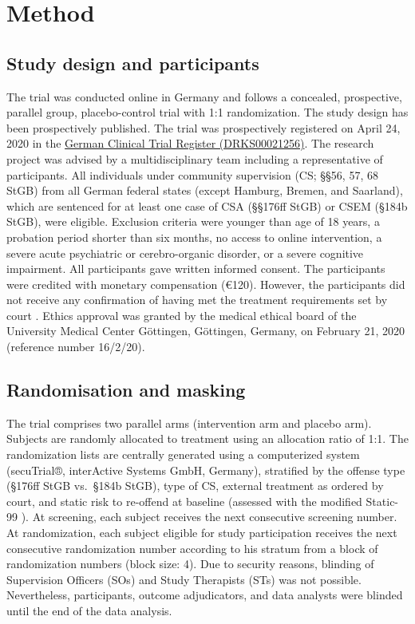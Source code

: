 \documentclass[
  super,
  preprint,
  1p,
  onecolumn]{elsarticle}
\begin{document}
\section{Method}\label{method}

\subsection{Study design and
participants}\label{study-design-and-participants}

The trial was conducted online in Germany and follows a concealed,
prospective, parallel group, placebo-control trial with 1:1
randomization. The study design has been prospectively published.
\citep{frombergerMyTabuAPlaceboControlled2021} The trial was
prospectively registered on April 24, 2020 in the
\href{https://drks.de/search/en/trial/DRKS00021256}{German Clinical
Trial Register (DRKS00021256)}. The research project was advised by a
multidisciplinary team including a representative of participants. All
individuals under community supervision (CS; §§56, 57, 68 StGB) from all
German federal states (except Hamburg, Bremen, and Saarland), which are
sentenced for at least one case of CSA (§§176ff StGB) or CSEM (§184b
StGB), were eligible. Exclusion criteria were younger than age of 18
years, a probation period shorter than six months, no access to online
intervention, a severe acute psychiatric or cerebro-organic disorder, or
a severe cognitive impairment. All participants gave written informed
consent. The participants were credited with monetary compensation
(€120). However, the participants did not receive any confirmation of
having met the treatment requirements set by court . Ethics approval was
granted by the medical ethical board of the University Medical Center
Göttingen, Göttingen, Germany, on February 21, 2020 (reference number
16/2/20).

\subsection{Randomisation and masking}\label{randomisation-and-masking}

The trial comprises two parallel arms (intervention arm and placebo
arm). Subjects are randomly allocated to treatment using an allocation
ratio of 1:1. The randomization lists are centrally generated using a
computerized system (secuTrial®, interActive Systems GmbH, Germany),
stratified by the offense type (§176ff StGB vs.~§184b StGB), type of CS,
external treatment as ordered by court, and static risk to re-offend at
baseline (assessed with the modified Static-99
\citep{setoOnlineSolicitationOffenders2012}). At screening, each subject
receives the next consecutive screening number. At randomization, each
subject eligible for study participation receives the next consecutive
randomization number according to his stratum from a block of
randomization numbers (block size: 4). Due to security reasons, blinding
of Supervision Officers (SOs) and Study Therapists (STs) was not
possible. Nevertheless, participants, outcome adjudicators, and data
analysts were blinded until the end of the data analysis.
\end{document}
